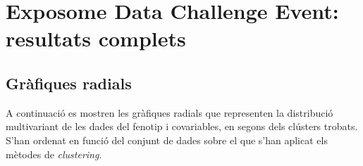 \documentclass[CAT,BIB]{TFUOC}%
\begin{document}
\newpage
\appendix

\chapter{Exposome Data Challenge Event: resultats complets}
\label{a:exposome}

    \section{Gràfiques radials}

        A continuació es mostren les gràfiques radials
        que representen la distribució multivariant
        de les dades del fenotip i covariables,
        en segons dels clústers trobats.
        S'han ordenat en funció del conjunt de dades
        sobre el que s'han aplicat els mètodes de \textit{clustering}.
%
%
%
%
%
\end{document}
